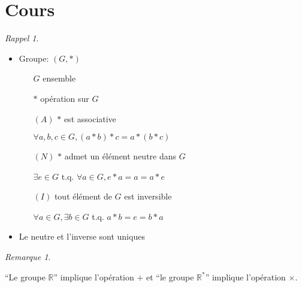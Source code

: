 \documentclass{report}
\newcounter{cours}
\newcommand*{\cours}{\section*{Cours \thecours}\stepcounter{cours}}
\theoremstyle{definition}
\theoremstyle{remark}
\newtheorem*{rema}{Remarque}
\newtheorem*{rappel}{Rappel}
\begin{document}
	\cours
	\begin{rappel}
		~

		\begin{itemize}[noitemsep]
			\item Groupe: $(G,*)$
			\begin{itemize}
				\item[$G$] ensemble
				\item[$*$] op\'eration sur $G$
				\item[$(A)$] $*$ est associative

				$\forall a,b,c \in G, (a*b)*c=a*(b*c)$
				\item[$(N)$] $*$ admet un \'el\'ement neutre dans $G$

				$\exists e \in G$ t.q. $\forall a \in G, e*a=a=a*e$
				\item[$(I)$] tout \'el\'ement de $G$ est inversible

				$\forall a \in G, \exists b \in G$ t.q. $a*b=e=b*a$
			\end{itemize}
			\item Le neutre et l'inverse sont uniques
		\end{itemize}
	\end{rappel}

	\begin{rema}
		~

		``Le groupe $\mathbb{R}$'' implique l'op\'eration $+$ et ``le groupe $\mathbb{R}^*$'' implique l'op\'eration $\times$.
	\end{rema}
\end{document}
